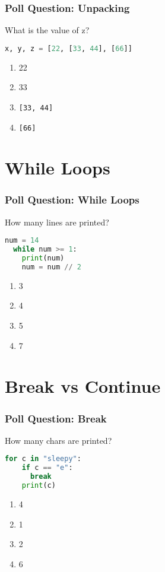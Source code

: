 \documentclass{beamer}
\begin{document}
%
%
\begin{frame}[fragile]
  \frametitle{Poll Question: Unpacking}
  What is the value of z?
  \begin{lstlisting}[language=Python, autogobble]
  x, y, z = [22, [33, 44], [66]]
  \end{lstlisting}
  \vfill
  \begin{enumerate}[A]
    \item 22
    \item 33
    \item \lstinline|[33, 44]|
    \item \lstinline|[66]|
  \end{enumerate}
\end{frame}


\section{While Loops}

%
%
\begin{frame}[fragile]
  \frametitle{Poll Question: While Loops}
  How many lines are printed?
  \begin{lstlisting}[language=Python, autogobble]
  num = 14
  while num >= 1:
    print(num)
    num = num // 2
  \end{lstlisting}
  \vfill
  \begin{enumerate}[A]
    \item 3
    \item 4
    \item 5
    \item 7
  \end{enumerate}
\end{frame}

\section{Break vs Continue}
%
%
\begin{frame}[fragile]
  \frametitle{Poll Question: Break}
  How many chars are printed?
  \begin{lstlisting}[language=Python, autogobble]
  for c in "sleepy":
    if c == "e":
      break
    print(c)
  \end{lstlisting}
  \vfill
  \begin{enumerate}[A]
    \item 4
    \item 1
    \item 2
    \item 6
  \end{enumerate}
\end{frame}
\end{document}
